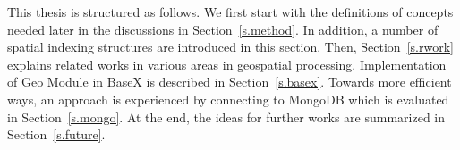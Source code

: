 \documentclass[a4paper,12pt]{article}
\begin{document}

This thesis is structured as follows. We first start with the definitions of concepts needed later in the discussions
in Section~\ref{s.method}. In addition, a number of spatial indexing structures are introduced in this section. 
Then, Section~\ref{s.rwork} explains related works in various areas in geospatial processing. Implementation of Geo Module in BaseX is described in Section~\ref{s.basex}. 
Towards more efficient ways, an approach is experienced by connecting to MongoDB which is evaluated in Section~\ref{s.mongo}.
At the end, the ideas for further works are summarized in
Section~\ref{s.future}.


\newpage
\end{document}
